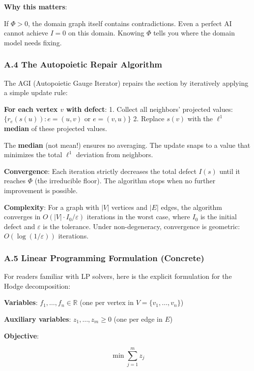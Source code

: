 \documentclass[
]{article}
\begin{document}
\textbf{Why this matters}:

If \(\Phi > 0\), the domain graph itself contains contradictions. Even a
perfect AI cannot achieve \(I = 0\) on this domain. Knowing \(\Phi\)
tells you where the domain model needs fixing.

\subsubsection{A.4 The Autopoietic Repair
Algorithm}\label{a.4-the-autopoietic-repair-algorithm}

The AGI (Autopoietic Gauge Iterator) repairs the section by iteratively
applying a simple update rule:

\textbf{For each vertex \(v\) with defect}: 1. Collect all neighbors'
projected values: \(\{r_e(s(u)) : e = (u, v) \text{ or } e = (v, u)\}\)
2. Replace \(s(v)\) with the \textbf{\(\ell^1\) median} of these
projected values.

The \textbf{median} (not mean!) ensures no averaging. The update snaps
to a value that minimizes the total \(\ell^1\) deviation from neighbors.

\textbf{Convergence}: Each iteration strictly decreases the total defect
\(I(s)\) until it reaches \(\Phi\) (the irreducible floor). The
algorithm stops when no further improvement is possible.

\textbf{Complexity}: For a graph with \(|V|\) vertices and \(|E|\)
edges, the algorithm converges in \(O(|V| \cdot I_0 / \varepsilon)\)
iterations in the worst case, where \(I_0\) is the initial defect and
\(\varepsilon\) is the tolerance. Under non-degeneracy, convergence is
geometric: \(O(\log(1/\varepsilon))\) iterations.

\subsubsection{A.5 Linear Programming Formulation
(Concrete)}\label{a.5-linear-programming-formulation-concrete}

For readers familiar with LP solvers, here is the explicit formulation
for the Hodge decomposition:

\textbf{Variables}: \(f_1, \ldots, f_n \in \mathbb{R}\) (one per vertex
in \(V = \{v_1, \ldots, v_n\}\))

\textbf{Auxiliary variables}: \(z_1, \ldots, z_m \geq 0\) (one per edge
in \(E\))

\textbf{Objective}:

\[\min \sum_{j=1}^m z_j\]
\end{document}
